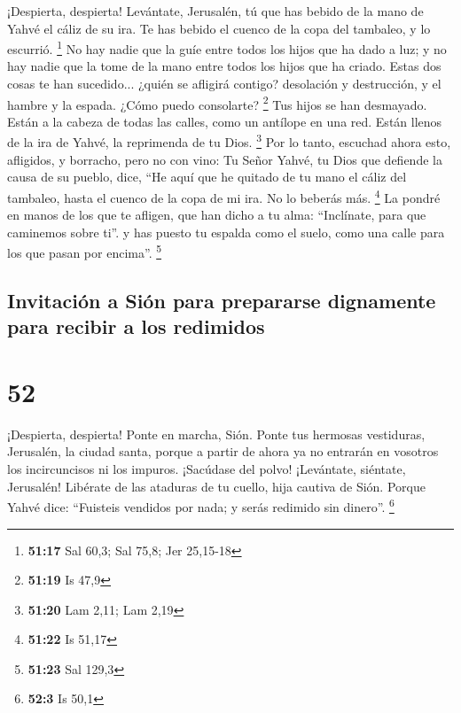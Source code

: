  ¡Despierta, despierta! Levántate, Jerusalén, tú que has
bebido de la mano de Yahvé el cáliz de su ira. Te has bebido el cuenco
de la copa del tambaleo, y lo escurrió. \footnote{\textbf{51:17} Sal
  60,3; Sal 75,8; Jer 25,15-18}  No hay nadie que la guíe
entre todos los hijos que ha dado a luz; y no hay nadie que la tome de
la mano entre todos los hijos que ha criado.  Estas dos
cosas te han sucedido... ¿quién se afligirá contigo? desolación y
destrucción, y el hambre y la espada. ¿Cómo puedo consolarte?
\footnote{\textbf{51:19} Is 47,9}  Tus hijos se han
desmayado. Están a la cabeza de todas las calles, como un antílope en
una red. Están llenos de la ira de Yahvé, la reprimenda de tu Dios.
\footnote{\textbf{51:20} Lam 2,11; Lam 2,19}  Por lo
tanto, escuchad ahora esto, afligidos, y borracho, pero no con vino:
 Tu Señor Yahvé, tu Dios que defiende la causa de su
pueblo, dice, ``He aquí que he quitado de tu mano el cáliz del tambaleo,
hasta el cuenco de la copa de mi ira. No lo beberás más. \footnote{\textbf{51:22}
  Is 51,17}  La pondré en manos de los que te afligen,
que han dicho a tu alma: ``Inclínate, para que caminemos sobre ti''. y
has puesto tu espalda como el suelo, como una calle para los que pasan
por encima''. \footnote{\textbf{51:23} Sal 129,3}

\hypertarget{invitaciuxf3n-a-siuxf3n-para-prepararse-dignamente-para-recibir-a-los-redimidos}{%
\subsection{Invitación a Sión para prepararse dignamente para recibir a
los
redimidos}\label{invitaciuxf3n-a-siuxf3n-para-prepararse-dignamente-para-recibir-a-los-redimidos}}

\hypertarget{section-51}{%
\section{52}\label{section-51}}

 ¡Despierta, despierta! Ponte en marcha, Sión. Ponte tus
hermosas vestiduras, Jerusalén, la ciudad santa, porque a partir de
ahora ya no entrarán en vosotros los incircuncisos ni los impuros.
 ¡Sacúdase del polvo! ¡Levántate, siéntate, Jerusalén!
Libérate de las ataduras de tu cuello, hija cautiva de Sión.
 Porque Yahvé dice: ``Fuisteis vendidos por nada; y serás
redimido sin dinero''. \footnote{\textbf{52:3} Is 50,1}

